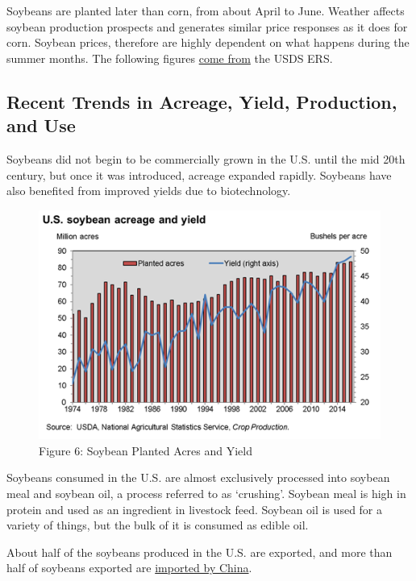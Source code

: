 \documentclass[]{book}
\theoremstyle{definition}
\theoremstyle{definition}
\theoremstyle{remark}
\begin{document}
Soybeans are planted later than corn, from about April to June. Weather
affects soybean production prospects and generates similar price
responses as it does for corn. Soybean prices, therefore are highly
dependent on what happens during the summer months. The following
figures
\href{http://www.ers.usda.gov/topics/crops/soybeans-oil-crops/background.aspx}{come
from} the USDS ERS.

\subsection{Recent Trends in Acreage, Yield, Production, and
Use}\label{recent-trends-in-acreage-yield-production-and-use}

Soybeans did not begin to be commercially grown in the U.S. until the
mid 20th century, but once it was introduced, acreage expanded rapidly.
Soybeans have also benefited from improved yields due to biotechnology.

\begin{figure}[htbp]
\centering
\includegraphics{images/Soy-Acres-Yield.png}
\caption{Figure 6: Soybean Planted Acres and Yield}
\end{figure}

Soybeans consumed in the U.S. are almost exclusively processed into
soybean meal and soybean oil, a process referred to as `crushing'.
Soybean meal is high in protein and used as an ingredient in livestock
feed. Soybean oil is used for a variety of things, but the bulk of it is
consumed as edible oil.

About half of the soybeans produced in the U.S. are exported, and more
than half of soybeans exported are
\href{http://farmdocdaily.illinois.edu/2015/03/footprint-of-chinese-demand-for-us-soybeans.html}{imported
by China}.
\end{document}
